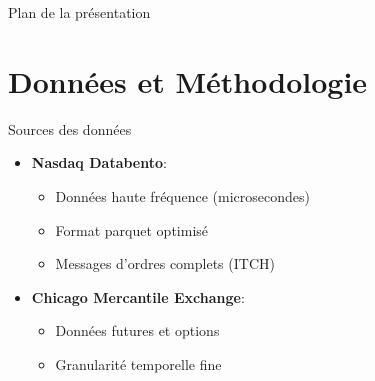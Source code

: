 \documentclass[aspectratio=169]{beamer}  %
\begin{document}
\begin{frame}{Plan de la présentation}
    \tableofcontents
\end{frame}

\section{Données et Méthodologie}

\begin{frame}{Sources des données}
    \begin{itemize}
        \item \textbf{Nasdaq Databento}:
        \begin{itemize}
            \item Données haute fréquence (microsecondes)
            \item Format parquet optimisé
            \item Messages d'ordres complets (ITCH)
        \end{itemize}
        \item \textbf{Chicago Mercantile Exchange}:
        \begin{itemize}
            \item Données futures et options
            \item Granularité temporelle fine
        \end{itemize}
    \end{itemize}
\end{frame}
\end{document}
